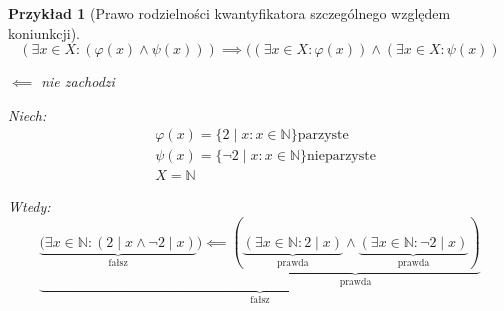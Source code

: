 \documentclass[a5paper,8pt]{article}
\theoremstyle{mythmstyle}
\newtheorem*{example}{Przykład}
\begin{document}
            \pagebreak
            \begin{example}[Prawo rodzielności kwantyfikatora szczególnego względem koniunkcji]
                \begin{equation*}
                    (\exists x \in X : ( \varphi(x) \wedge \psi(x))) \implies ((\exists x \in X : \varphi(x)) \wedge (\exists x \in X : \psi(x))
                \end{equation*}

                \begin{center}
                    $ \impliedby $ nie zachodzi
                \end{center}

                Niech:
                \begin{equation*}
                    \begin{aligned}
                        & \varphi(x) = \{ 2 \mid x : x \in \mathbb{N} \} \text{parzyste}\\
                        & \psi(x) = \{ \neg 2 \mid x : x \in \mathbb{N} \} \text{nieparzyste} \\
                        & X = \mathbb{N}
                    \end{aligned}
                \end{equation*}

                Wtedy:
                \begin{equation*}
                    \underbrace{\underbrace{(\exists x \in \mathbb{N} : (2\mid x \wedge \neg 2\mid x )}_{\text{fałsz}})
                    \impliedby \underbrace{(\underbrace{(\exists x \in \mathbb{N} : 2 \mid x)}_{\text{prawda}} \wedge \underbrace{(\exists x \in \mathbb{N} : \neg 2 \mid x)}_{\text{prawda}})}_{\text{prawda}}}_{\text{fałsz}}
                \end{equation*}

            \end{example}
\end{document}
